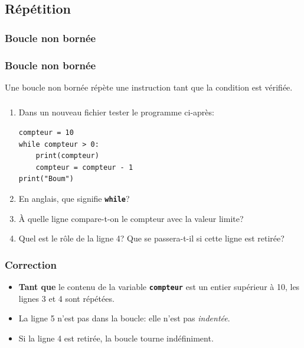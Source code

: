 \documentclass[svgnames,11pt]{beamer}
\begin{document}
\subsection{Répétition}
\subsubsection{Boucle non bornée}
\begin{frame}
    \frametitle{Boucle non bornée}

    \begin{aretenir}[]
        Une boucle non bornée répète une instruction tant que la condition est vérifiée.
    \end{aretenir}

\end{frame}
\begin{frame}[fragile]
    \frametitle{}

    \begin{activite}
        \begin{enumerate}
            \item Dans un nouveau fichier tester le programme ci-après:
                  \begin{lstlisting}
compteur = 10
while compteur > 0:
    print(compteur)
    compteur = compteur - 1
print("Boum")
\end{lstlisting}
            \item En anglais, que signifie \textbf{\texttt{while}}?
            \item À quelle ligne compare-t-on le compteur avec la valeur limite?
            \item Quel est le rôle de la ligne 4? Que se passera-t-il si cette ligne est retirée?
        \end{enumerate}
    \end{activite}

\end{frame}
\begin{frame}
    \frametitle{Correction}

\begin{itemize}
    \item<1-> \textbf{Tant que} le contenu de la variable \textbf{\texttt{compteur}} est un entier supérieur à 10, les lignes 3 et 4 sont répétées.
    \item<2-> La ligne 5 n'est pas dans la boucle: elle n'est pas \emph{indentée}.
    \item<3-> Si la ligne 4 est retirée, la boucle tourne indéfiniment.
\end{itemize}

\end{frame}
\end{document}
